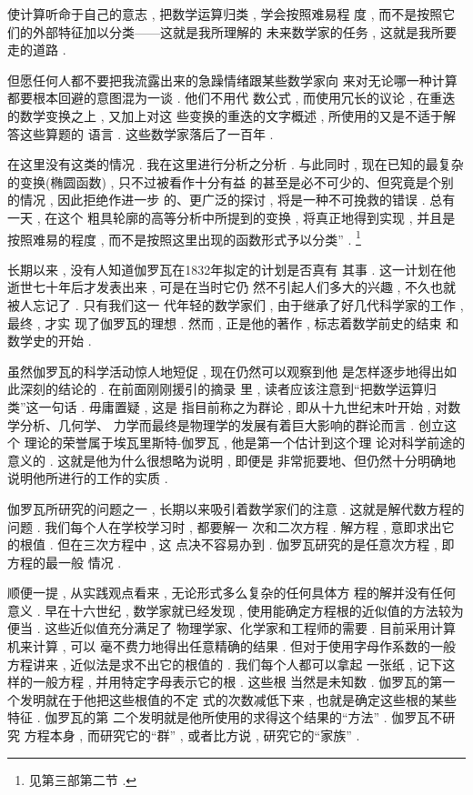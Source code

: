 使计算听命于自己的意志 , 把数学运算归类 , 学会按照难易程 度 , 而不是按照它们的外部特征加以分类——这就是我所理解的 未来数学家的任务 , 这就是我所要走的道路 . 

但愿任何人都不要把我流露出来的急躁情绪跟某些数学家向 来对无论哪一种计算都要根本回避的意图混为一谈 . 他们不用代 数公式 , 而使用冗长的议论 , 在重迭的数学变换之上 , 又加上对这 些变换的重迭的文字概述 , 所使用的又是不适于解答这些算题的 语言 . 这些数学家落后了一百年 . 

在这里没有这类的情况 . 我在这里进行分析之分析 . 与此同时 , 现在已知的最复杂的变换(椭圆函数) , 只不过被看作十分有益 的甚至是必不可少的、但究竟是个别的情况 , 因此拒绝作进一步 的、更广泛的探讨 , 将是一种不可挽救的错误 . 总有一天 , 在这个 粗具轮廓的高等分析中所提到的变换 , 将真正地得到实现 , 并且是 按照难易的程度 , 而不是按照这里出现的函数形式予以分类” . \footnote{见第三部第二节 . }

长期以来 , 没有人知道伽罗瓦在1832年拟定的计划是否真有 其事 . 这一计划在他逝世七十年后才发表出来 , 可是在当时它仍 然不引起人们多大的兴趣 , 不久也就被人忘记了 . 只有我们这一 代年轻的数学家们 , 由于继承了好几代科学家的工作 , 最终 , 才实 现了伽罗瓦的理想 . 然而 , 正是他的著作 , 标志着数学前史的结束 和数学史的开始 . 

虽然伽罗瓦的科学活动惊人地短促 , 现在仍然可以观察到他 是怎样逐步地得出如此深刻的结论的 . 在前面刚刚援引的摘录 里 , 读者应该注意到“把数学运算归类”这一句话 . 毋庸置疑 , 这是 指目前称之为群论 , 即从十九世纪末叶开始 , 对数学分析、几何学、 力学而最终是物理学的发展有着巨大影响的群论而言 . 创立这个 理论的荣誉属于埃瓦里斯特-伽罗瓦 , 他是第一个估计到这个理 论对科学前途的意义的 . 这就是他为什么很想略为说明 , 即便是 非常扼要地、但仍然十分明确地说明他所进行的工作的实质 . 

伽罗瓦所研究的问题之一 , 长期以来吸引着数学家们的注意 .  这就是解代数方程的问题 . 我们每个人在学校学习时 , 都要解一 次和二次方程 . 解方程 , 意即求出它的根值 . 但在三次方程中 , 这 点决不容易办到 . 伽罗瓦研究的是任意次方程 , 即方程的最一般 情况 . 

顺便一提 , 从实践观点看来 , 无论形式多么复杂的任何具体方 程的解并没有任何意义 . 早在十六世纪 , 数学家就已经发现 , 使用能确定方程根的近似值的方法较为便当 . 这些近似值充分满足了 物理学家、化学家和工程师的需要 . 目前采用计算机来计算 , 可以 毫不费力地得出任意精确的结果 . 但对于使用字母作系数的一般 方程讲来 , 近似法是求不出它的根值的 . 我们每个人都可以拿起 一张纸 , 记下这样的一般方程 , 并用特定字母表示它的根 . 这些根 当然是未知数 . 伽罗瓦的第一个发明就在于他把这些根值的不定 式的次数减低下来 , 也就是确定这些根的某些特征 . 伽罗瓦的第 二个发明就是他所使用的求得这个结果的“方法” . 伽罗瓦不研究 方程本身 , 而研究它的“群” , 或者比方说 , 研究它的“家族” . 


